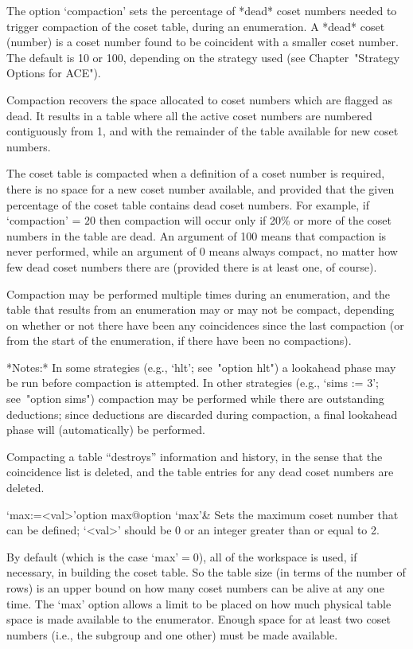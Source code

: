 The option `compaction' sets the percentage of  *dead*  coset  numbers
needed  to  trigger  compaction  of  the  coset   table,   during   an
enumeration. A *dead* coset (number) is a coset  number  found  to  be
coincident with a smaller coset number. The  default  is  10  or  100,
depending on the strategy  used  (see  Chapter~"Strategy  Options  for
ACE").

Compaction recovers the space allocated to  coset  numbers  which  are
flagged as dead. It results in a table  where  all  the  active  coset
numbers are numbered contiguously from 1, and with  the  remainder  of
the table available for new coset numbers.

The coset table is compacted when a definition of a  coset  number  is
required, there is no space for a  new  coset  number  available,  and
provided that the given percentage of the coset  table  contains  dead
coset numbers. For example, if `compaction'  =  $20$  then  compaction
will occur only if 20\% or more of the coset numbers in the table  are
dead. An argument of 100 means that  compaction  is  never  performed,
while an argument of 0 means always compact, no matter  how  few  dead
coset numbers there are (provided there is at least one, of course).

Compaction may be performed  multiple times during an enumeration, and
the table that results from an  enumeration may or may not be compact,
depending on whether or not there have been any coincidences since the
last compaction (or  from the start of the  enumeration, if there have
been no compactions).

*Notes:*
In some strategies (e.g., `hlt'; see~"option hlt") a  lookahead  phase
may be run before compaction is attempted. In other strategies  (e.g.,
`sims := 3'; see~"option sims")  compaction  may  be  performed  while
there are  outstanding  deductions;  since  deductions  are  discarded
during compaction, a final lookahead  phase  will  (automatically)  be
performed.

Compacting a table ``destroys'' information and history, in the  sense
that the coincidence list is deleted, and the table  entries  for  any
dead coset numbers are deleted.

\>`max:=<val>'{option max}@{option `max'}&
Sets the maximum coset number that can be defined;
`<val>' should be $0$ or an integer greater than or equal to 2.

By default (which is the case `max'${}=0$), all of  the  workspace  is
used, if necessary, in building the coset table. So the table size (in
terms of the number of rows) is an  upper  bound  on  how  many  coset
numbers can be alive at any one time. The `max' option allows a  limit
to be placed on how much physical table space is made available to the
enumerator. Enough space for at least two  coset  numbers  (i.e.,  the
subgroup and one other) must be made available.

